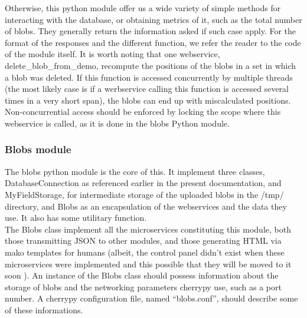 Otherwise, this python module offer us a wide variety of simple methods for interacting with the database, or obtaining metrics of it, such as the total number of blobs. They generally return the information asked if such case apply. For the format of the responses and the different function, we refer the reader to the code of the module itself. It is worth noting that one webservice, delete\_blob\_from\_demo, recompute the positions of the blobs in a set in which a blob was deleted. If this function is accessed concurrently by multiple threads (the most likely case is if a werbservice calling this function is accessed several times in a very short span), the blobs can end up with miscalculated positions. Non-concurrential access should be enforced by locking the scope where this webservice is called, as it is done in the blobs  Python module. \\

\subsubsection{Blobs module}
The blobs python module is the core of this. It implement three classes, DatabaseConnection as referenced earlier in the present documentation, and MyFieldStorage, for intermediate storage of the uploaded blobs in the /tmp/ directory, and Blobs as an encapsulation of the webservices and the data they use. It also has some utilitary function. \\

The Blobs class implement  all the microservices constituting this module, both those transmitting JSON to other modules, and those generating HTML  via mako templates  for humans (albeit, the control panel didn't exist when these microservices were implemented and this possible that they will be moved to it soon ). An instance of the Blobs class should possess information about the storage of blobs and the networking parameters cherrypy use, such as a port number. A cherrypy configuration file, named ``blobs.conf'', should describe  some of these informations. \\

